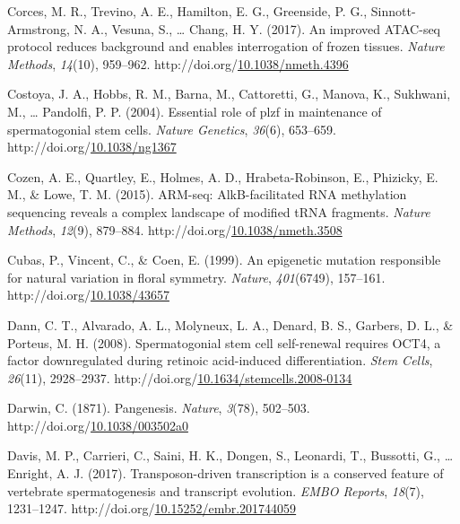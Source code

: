 \documentclass[12pt,twoside]{reedthesis}
\newlength{\cslhangindent}
\newenvironment{CSLReferences}[2] %
 {%
  \setlength{\parindent}{0pt}
  \ifodd #1 \everypar{\setlength{\hangindent}{\cslhangindent}}\ignorespaces\fi
  \ifnum #2 > 0
  \setlength{\parskip}{#2\baselineskip}
  \fi
 }%
 {}
\begin{document}
\begin{CSLReferences}{1}{0}
\leavevmode{}%
Corces, M. R., Trevino, A. E., Hamilton, E. G., Greenside, P. G., Sinnott-Armstrong, N. A., Vesuna, S., \ldots{} Chang, H. Y. (2017). An improved ATAC-seq protocol reduces background and enables interrogation of frozen tissues. \emph{Nature Methods}, \emph{14}(10), 959--962. http://doi.org/\href{https://doi.org/10.1038/nmeth.4396}{10.1038/nmeth.4396}

\leavevmode{}%
Costoya, J. A., Hobbs, R. M., Barna, M., Cattoretti, G., Manova, K., Sukhwani, M., \ldots{} Pandolfi, P. P. (2004). Essential role of plzf in maintenance of spermatogonial stem cells. \emph{Nature Genetics}, \emph{36}(6), 653--659. http://doi.org/\href{https://doi.org/10.1038/ng1367}{10.1038/ng1367}

\leavevmode{}%
Cozen, A. E., Quartley, E., Holmes, A. D., Hrabeta-Robinson, E., Phizicky, E. M., \& Lowe, T. M. (2015). ARM-seq: AlkB-facilitated RNA methylation sequencing reveals a complex landscape of modified tRNA fragments. \emph{Nature Methods}, \emph{12}(9), 879--884. http://doi.org/\href{https://doi.org/10.1038/nmeth.3508}{10.1038/nmeth.3508}

\leavevmode{}%
Cubas, P., Vincent, C., \& Coen, E. (1999). An epigenetic mutation responsible for natural variation in floral symmetry. \emph{Nature}, \emph{401}(6749), 157--161. http://doi.org/\href{https://doi.org/10.1038/43657}{10.1038/43657}

\leavevmode{}%
Dann, C. T., Alvarado, A. L., Molyneux, L. A., Denard, B. S., Garbers, D. L., \& Porteus, M. H. (2008). Spermatogonial stem cell self-renewal requires OCT4, a factor downregulated during retinoic acid-induced differentiation. \emph{Stem Cells}, \emph{26}(11), 2928--2937. http://doi.org/\href{https://doi.org/10.1634/stemcells.2008-0134}{10.1634/stemcells.2008-0134}

\leavevmode{}%
Darwin, C. (1871). Pangenesis. \emph{Nature}, \emph{3}(78), 502--503. http://doi.org/\href{https://doi.org/10.1038/003502a0}{10.1038/003502a0}

\leavevmode{}%
Davis, M. P., Carrieri, C., Saini, H. K., Dongen, S., Leonardi, T., Bussotti, G., \ldots{} Enright, A. J. (2017). Transposon{-}driven transcription is a conserved feature of vertebrate spermatogenesis and transcript evolution. \emph{EMBO Reports}, \emph{18}(7), 1231--1247. http://doi.org/\href{https://doi.org/10.15252/embr.201744059}{10.15252/embr.201744059}


\end{CSLReferences}
\end{document}
